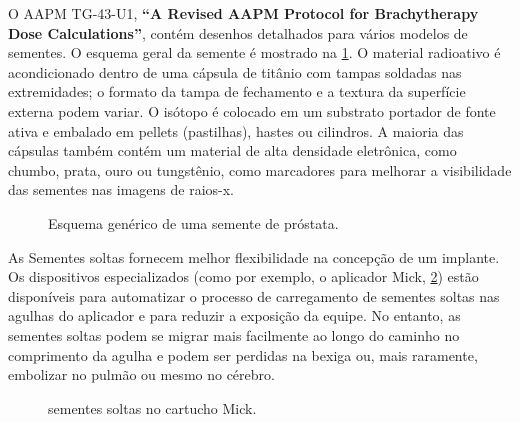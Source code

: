 \documentclass[11pt,a4paper]{article}
\newcounter{exemplo}
\begin{document}
	O AAPM TG-43-U1, \textbf{``A Revised AAPM Protocol for Brachytherapy Dose Calculations''}, contém desenhos detalhados para vários modelos de sementes. O esquema geral da semente é mostrado na \ref{fig:esquemaSementeProstata}. O material radioativo é acondicionado dentro de uma cápsula de titânio com tampas soldadas nas extremidades; o formato da tampa de fechamento e a textura da superfície externa podem variar. O isótopo é colocado em um substrato portador de fonte ativa e embalado em pellets (pastilhas), hastes ou cilindros. A maioria das cápsulas também contém um material de alta densidade eletrônica, como chumbo, prata, ouro ou tungstênio, como marcadores para melhorar a visibilidade das sementes nas imagens de raios-x.

	\begin{figure}[h]
		\centering
		\caption{Esquema genérico de uma semente de próstata.}
		\label{fig:esquemaSementeProstata}
	\end{figure}

	As Sementes soltas fornecem melhor flexibilidade na concepção de um implante. Os dispositivos especializados (como por exemplo, o aplicador Mick, \ref{fig:sementesSoltasMick}) estão disponíveis para automatizar o processo de carregamento de sementes soltas nas agulhas do aplicador e para reduzir a exposição da equipe. No entanto, as sementes soltas podem se migrar mais facilmente ao longo do caminho no comprimento da agulha e podem ser perdidas na bexiga ou, mais raramente, embolizar no pulmão ou mesmo no cérebro.

	\begin{figure}[h]
		\centering
		\caption{sementes soltas no cartucho Mick.}
		\label{fig:sementesSoltasMick}
	\end{figure}
\end{document}
